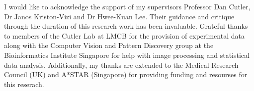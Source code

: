 \begin{acknowledgements}
I would like to acknowledge the support of my supervisors Professor Dan Cutler, Dr Janos Kriston-Vizi and Dr Hwee-Kuan Lee. Their guidance and critique through the duration of this research work has been invaluable. Grateful thanks to members of the Cutler Lab at LMCB for the provision of experimental data along with the Computer Vision and Pattern Discovery group at the Bioinformatics Institute Singapore for help with image processing and statistical data analysis. Additionally, my thanks are extended to the Medical Research Council (UK) and A*STAR (Singapore) for providing funding and resourses for this reserach.
\end{acknowledgements}
